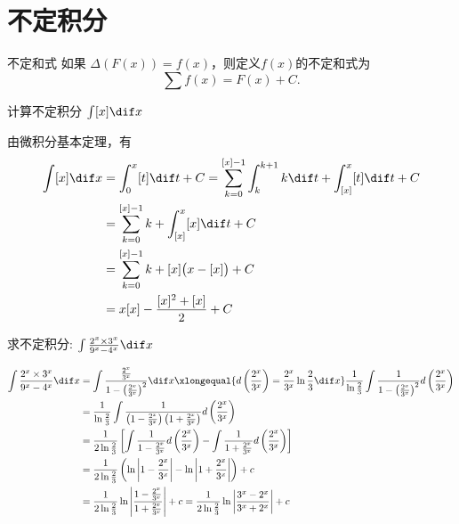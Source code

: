\documentclass[color=green,titlestyle=hang]{elegantbook}%
\begin{document}
\section{不定积分}

\begin{definition}{不定和式}{}
如果 $\Delta(F(x))=f(x)$，则定义$f(x)$的{\color{blue}不定和式}为
\[ \sum f(x) = F(x) + C. \]
\end{definition}

\begin{example}
计算不定积分 $\int[x]\dif x$
\end{example}\begin{solution}
由微积分基本定理，有
\begin{align*}
\int[x]\dif x&=\int_0^x[t]\dif t+C=\sum_{k=0}^{[x]-1}\int_k^{k+1}k\dif t+\int_{[x]}^x[t]\dif t+C\\
&=\sum_{k=0}^{[x]-1}k+\int_{[x]}^x[x]\dif t+C\\
&=\sum_{k=0}^{[x]-1}k+[x]\big(x-[x]\big)+C\\
&=x[x]-\frac{[x]^2+[x]}{2}+C
\end{align*}	
\end{solution}

\begin{exercise}
求不定积分: $\int {\frac{{{2^x} \times {3^x}}}{{{9^x} - {4^x}}}} \dif x$	
\end{exercise}\begin{solution}
\begin{align*}
\int {\frac{{{2^x} \times {3^x}}}{{{9^x} - {4^x}}}} \dif x&= \int {\frac{{\frac{{{2^x}}}{{{3^x}}}}}{{1 - {{\left( {\frac{{{2^x}}}{{{3^x}}}} \right)}^2}}}} \dif x\xlongequal{{d\left( {\frac{{{2^x}}}{{{3^x}}}} \right) = \frac{{{2^x}}}{{{3^x}}}\ln \frac{2}{3}\dif x}}
\frac{1}{{\ln \frac{2}{3}}}\int {\frac{1}{{1 - {{\left( {\frac{{{2^x}}}{{{3^x}}}} \right)}^2}}}} d\left( {\frac{{{2^x}}}{{{3^x}}}} \right)\\
&= \frac{1}{{\ln \frac{2}{3}}}\int {\frac{1}{{\left( {1 - \frac{{{2^x}}}{{{3^x}}}} \right)\left( {1 + \frac{{{2^x}}}{{{3^x}}}} \right)}}} d\left( {\frac{{{2^x}}}{{{3^x}}}} \right)\\
&= \frac{1}{{2\ln \frac{2}{3}}}\left[ {\int {\frac{1}{{1 - \frac{{{2^x}}}{{{3^x}}}}}} d\left( {\frac{{{2^x}}}{{{3^x}}}} \right) - \int {\frac{1}{{1 + \frac{{{2^x}}}{{{3^x}}}}}} d\left( {\frac{{{2^x}}}{{{3^x}}}} \right)} \right]\\
&= \frac{1}{{2\ln \frac{2}{3}}}\left( {\ln \left| {1 - \frac{{{2^x}}}{{{3^x}}}} \right| - \ln \left| {1 + \frac{{{2^x}}}{{{3^x}}}} \right|} \right) + c \\
&= \frac{1}{{2\ln \frac{2}{3}}}\ln \left| {\frac{{1 - \frac{{{2^x}}}{{{3^x}}}}}{{1 + \frac{{{2^x}}}{{{3^x}}}}}} \right| + c = \frac{1}{{2\ln \frac{2}{3}}}\ln \left| {\frac{{{3^x} - {2^x}}}{{{3^x} + {2^x}}}} \right| + c
\end{align*}	
\end{solution}
\end{document}
